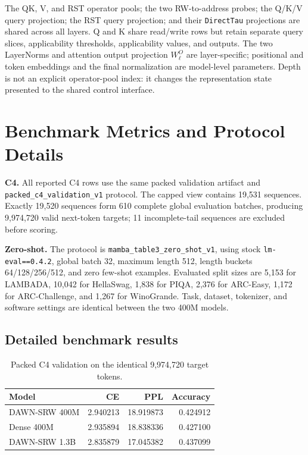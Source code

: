 \documentclass{article}
\newcommand{\DAWN}{DAWN-SRW}
\newcommand{\smallhead}[1]{\vspace{0.25em}\noindent\textbf{#1}}
\begin{document}
The QK, V, and RST operator pools; the two RW-to-address probes; the Q/K/V
query projection; the RST query projection; and their \texttt{DirectTau} projections
are shared across all layers. Q and K share read/write rows but retain separate
query slices, applicability thresholds, applicability values, and outputs. The two
LayerNorms and attention output projection \(W^O_\ell\) are layer-specific;
positional and token embeddings and the final normalization are model-level
parameters. Depth is not an explicit operator-pool index: it changes the representation
state presented to the shared control interface.

\section{Benchmark Metrics and Protocol Details}
\label{app:benchmarks}

\smallhead{C4.}
All reported C4 rows use the same packed validation artifact and
\texttt{packed\_c4\_validation\_v1} protocol. The capped view contains 19,531
sequences. Exactly 19,520 sequences form 610 complete global evaluation
batches, producing 9,974,720 valid next-token targets; 11 incomplete-tail
sequences are excluded before scoring.

\smallhead{Zero-shot.}
The protocol is \texttt{mamba\_table3\_zero\_shot\_v1}, using stock
\texttt{lm-eval==0.4.2}, global batch 32, maximum length 512, length buckets
64/128/256/512, and zero few-shot examples. Evaluated split sizes are 5,153
for LAMBADA, 10,042 for HellaSwag, 1,838 for PIQA, 2,376 for ARC-Easy, 1,172
for ARC-Challenge, and 1,267 for WinoGrande. Task, dataset, tokenizer, and
software settings are identical between the two 400M models.

\subsection{Detailed benchmark results}

\begin{table}[!t]
\centering
\caption{Packed C4 validation on the identical 9,974,720 target tokens.}
\label{tab:c4}
\small
\begin{tabular}{lrrr}
\toprule
Model & CE & PPL & Accuracy\\
\midrule
\DAWN{} 400M & 2.940213 & 18.919873 & 0.424912\\
Dense 400M & 2.935894 & 18.838336 & 0.427100\\
\DAWN{} 1.3B & 2.835879 & 17.045382 & 0.437099\\
\bottomrule
\end{tabular}
\end{table}
\end{document}
